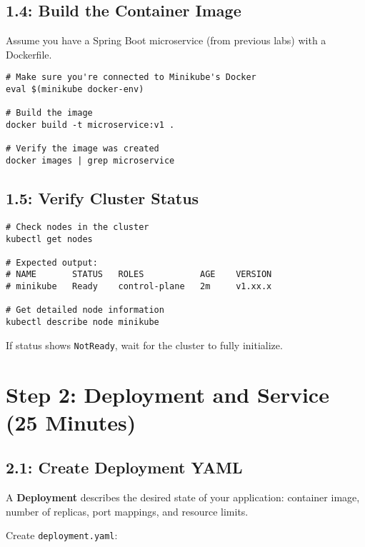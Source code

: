 \documentclass[12pt,a4paper]{article}
\begin{document}
\subsection{1.4: Build the Container Image}

Assume you have a Spring Boot microservice (from previous labs) with a Dockerfile.

\begin{lstlisting}[caption=Build Docker image]
# Make sure you're connected to Minikube's Docker
eval $(minikube docker-env)

# Build the image
docker build -t microservice:v1 .

# Verify the image was created
docker images | grep microservice
\end{lstlisting}

\subsection{1.5: Verify Cluster Status}

\begin{lstlisting}[caption=Verify cluster status]
# Check nodes in the cluster
kubectl get nodes

# Expected output:
# NAME       STATUS   ROLES           AGE    VERSION
# minikube   Ready    control-plane   2m     v1.xx.x

# Get detailed node information
kubectl describe node minikube
\end{lstlisting}

\begin{tipbox}
If status shows \texttt{NotReady}, wait for the cluster to fully initialize.
\end{tipbox}

\newpage

\section{Step 2: Deployment and Service (25 Minutes)}

\subsection{2.1: Create Deployment YAML}

A \textbf{Deployment} describes the desired state of your application: container image, number of replicas, port mappings, and resource limits.

Create \texttt{deployment.yaml}:
\end{document}
